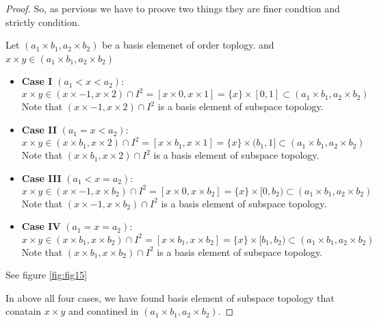 \documentclass[
]{book}
\theoremstyle{definition}
\theoremstyle{definition}
\theoremstyle{definition}
\theoremstyle{definition}
\theoremstyle{remark}
\begin{document}
\begin{proof}
So, as pervious we have to proove two things they are finer condtion and strictly condition.

Let \((a_1\times b_1, a_2 \times b_2)\) be a basis elemenet of order toplogy. and \(x\times y \in (a_1\times b_1, a_2 \times b_2)\)

\begin{itemize}
\item
  \textbf{Case I} \((a_1<x<a_2)\):
  \[x\times y \in (x\times-1,x\times 2)\cap I^2= [x\times 0,x\times 1]=\{x\}\times [0,1] \subset (a_1\times b_1, a_2 \times b_2)\]
  Note that \((x\times -1,x\times 2)\cap I^2\) is a basis element of subspace topology.
\item
  \textbf{Case II} \((a_1=x<a_2)\):
  \[x\times y \in (x\times b_1,x\times 2)\cap I^2= [x\times b_1,x\times 1]=\{x\}\times (b_1,1] \subset (a_1\times b_1, a_2 \times b_2)\]
  Note that \((x\times b_1,x\times 2)\cap I^2\) is a basis element of subspace topology.
\item
  \textbf{Case III} \((a_1<x=a_2)\):
  \[x\times y \in (x\times -1,x\times b_2)\cap I^2= [x\times 0,x\times b_2]=\{x\}\times [0,b_2) \subset (a_1\times b_1, a_2 \times b_2)\]
  Note that \((x\times -1,x\times b_2)\cap I^2\) is a basis element of subspace topology.
\item
  \textbf{Case IV} \((a_1=x=a_2)\):
  \[x\times y \in (x\times b_1,x\times b_2)\cap I^2= [x\times b_1,x\times b_2]=\{x\}\times [b_1,b_2) \subset (a_1\times b_1, a_2 \times b_2)\]
  Note that \((x\times b_1,x\times b_2)\cap I^2\) is a basis element of subspace topology.
\end{itemize}

See figure \ref{fig:fig15}

In above all four cases, we have found basis element of subspace topology that conatain \(x\times y\) and conatined in \((a_1\times b_1, a_2 \times b_2)\).
\end{proof}
\end{document}
